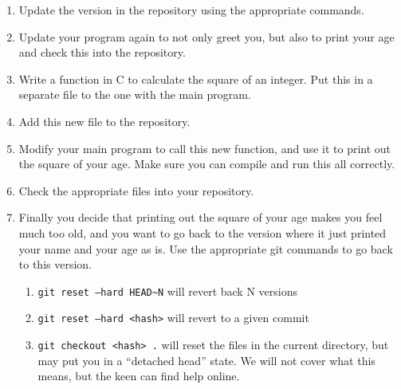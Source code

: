 \documentclass[a4paper, 12pt]{article}
\def \cc   {\tt }               %
\begin{document}
\begin{enumerate}
   \item Update the version in the repository using the appropriate commands.

   \item Update your program again to not only greet you, but also to print your age and check this into the repository.

   \item Write a function in C to calculate the square of an integer. Put this in a separate file to the one with the main program.

   \item Add this new file to the repository.

   \item Modify your main program to call this new function, and use it to print out the square of your age. Make sure you can compile and run this all correctly.

   \item Check the appropriate files into your repository.

   \item Finally you decide that printing out the square of your age makes you feel much too old, and you want to go back to the version where it just printed your name and your age as is. Use the appropriate git commands to go back to this version.
   \begin{enumerate}
       \item{} {\cc git reset --hard HEAD\verb#~#N} will revert back N versions
       \item{} {\cc git reset --hard <hash>} will revert to a given commit
       \item{} {\cc git checkout <hash> .} will reset the files in the current directory, but may put you in a ``detached head'' state. We will not cover what this means, but the keen can find help online.
   \end{enumerate}

\end{enumerate}

\end{document}
